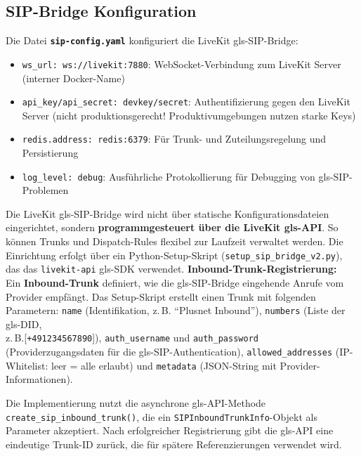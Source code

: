 \subsection{SIP-Bridge Konfiguration}
\label{sec:sip-bridge-config}

Die Datei \textbf{\texttt{sip-config.yaml}} konfiguriert die LiveKit \gls{gls-SIP}-Bridge:

\begin{itemize}
  \item \texttt{ws\_url: ws://livekit:7880}: WebSocket-Verbindung zum LiveKit Server (interner Docker-Name)
  \item \texttt{api\_key/api\_secret: devkey/secret}: Authentifizierung gegen den LiveKit Server (nicht produktionsgerecht! Produktivumgebungen nutzen starke Keys)
  \item \texttt{redis.address: redis:6379}: Für Trunk- und Zuteilungsregelung und Persistierung
  \item \texttt{log\_level: debug}: Ausführliche Protokollierung für Debugging von \gls{gls-SIP}-Problemen
\end{itemize}

Die LiveKit \gls{gls-SIP}-Bridge wird nicht über statische Konfigurationsdateien eingerichtet, sondern \textbf{programmgesteuert über die LiveKit \gls{gls-API}}. So können Trunks und Dispatch-Rules flexibel zur Laufzeit verwaltet werden. Die Einrichtung erfolgt über ein Python-Setup-Skript (\texttt{setup\_sip\_bridge\_v2.py}), das das \texttt{livekit-api} \gls{gls-SDK} verwendet.
\clearpage
\textbf{Inbound-Trunk-Registrierung:}\\
Ein \textbf{Inbound-Trunk} definiert, wie die \gls{gls-SIP}-Bridge eingehende Anrufe vom Provider empfängt. Das Setup-Skript erstellt einen Trunk mit folgenden Parametern: \texttt{name} (Identifikation, z.\,B. ``Plusnet Inbound''), \texttt{numbers} (Liste der \gls{gls-DID},\\ z.\,B.[\texttt{+491234567890}]), \texttt{auth\_username} und \texttt{auth\_password} (Providerzugangsdaten für die \gls{gls-SIP}-Authentication), \texttt{allowed\_addresses} (IP-Whitelist: leer = alle erlaubt) und \texttt{metadata} (JSON-String mit Provider-Informationen).

Die Implementierung nutzt die asynchrone \gls{gls-API}-Methode\\ \texttt{create\_sip\_inbound\_trunk()}, die ein \texttt{SIPInboundTrunkInfo}-Objekt als Parameter akzeptiert. Nach erfolgreicher Registrierung gibt die \gls{gls-API} eine eindeutige Trunk-ID zurück, die für spätere Referenzierungen verwendet wird.

